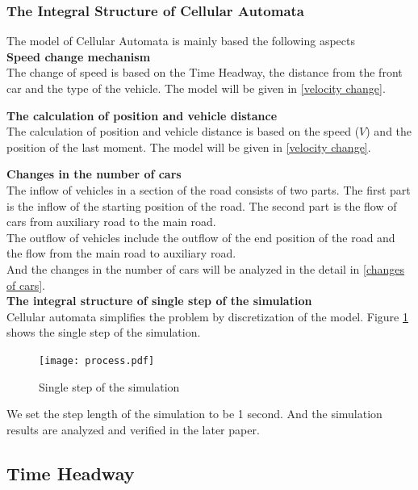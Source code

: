 \documentclass{mcmthesis}
\begin{document}
\subsubsection{The Integral Structure of Cellular Automata}
The model of Cellular Automata is mainly based the following aspects\\

\indent\textbf{Speed change mechanism\\}
\indent The change of speed is based on the Time Headway, the distance from the front car and the type of the vehicle. The model will be given in \ref{velocity change}.

\indent\textbf{The calculation of position and vehicle distance\\}
\indent The calculation of position and vehicle distance is based on the speed ($V$) and the position of the last moment. The model will be given in \ref{velocity change}.

\indent\textbf{Changes in the number of cars\\}
\indent The inflow of vehicles in a section of the road consists of two parts. The first part is the inflow of the starting position of the road. The second part is the flow of cars from auxiliary road to the main road. \\
\indent The outflow of vehicles include the outflow of the end position of the road and the flow from the main road to auxiliary road.\\
\indent And the changes in the number of cars will be analyzed in the detail in \ref{changes of cars}.\\

\indent\textbf{The integral structure of single step of the simulation\\}
\indent Cellular automata simplifies the problem by discretization of the model. Figure \ref{process} shows the single step of the simulation.
\begin{figure}[H]	%
	\centerline{\texttt{[image: process.pdf]}}
	\caption{Single step of the simulation}
	\label{process}
\end{figure}
\indent We set the step length of the simulation to be 1 second. And the simulation results are analyzed and verified in the later paper.
\subsection{Time Headway}
\label{headway}
\end{document}
